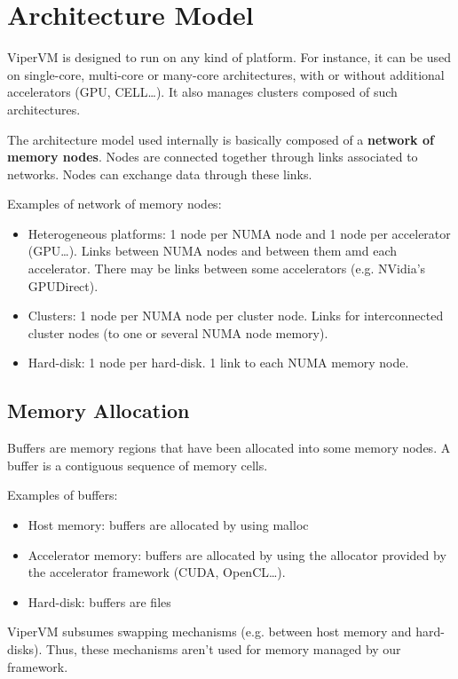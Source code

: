 \chapter{Architecture Model}

ViperVM is designed to run on any kind of platform. For instance, it can be
used on single-core, multi-core or many-core architectures, with or without
additional accelerators (GPU, CELL\ldots). It also manages clusters composed of
such architectures.

The architecture model used internally is basically composed of a \textbf{network of
memory nodes}. Nodes are connected together through links associated to
networks. Nodes can exchange data through these links.

Examples of network of memory nodes:
\begin{itemize}
  \item Heterogeneous platforms: 1 node per NUMA node and 1 node per accelerator
  (GPU\ldots). Links between NUMA nodes and between them amd each accelerator.
  There may be links between some accelerators (e.g. NVidia's GPUDirect).
  \item Clusters: 1 node per NUMA node per cluster node. Links for interconnected
  cluster nodes (to one or several NUMA node memory).
  \item Hard-disk: 1 node per hard-disk. 1 link to each NUMA memory node.
\end{itemize}

\section{Memory Allocation}
Buffers are memory regions that have been allocated into some memory nodes. A
buffer is a contiguous sequence of memory cells.

Examples of buffers:
\begin{itemize}
  \item Host memory: buffers are allocated by using malloc
  \item Accelerator memory: buffers are allocated by using the allocator
  provided by the accelerator framework (CUDA, OpenCL\ldots).
  \item Hard-disk: buffers are files
\end{itemize}

ViperVM subsumes swapping mechanisms (e.g. between host memory and  hard-disks).
Thus, these mechanisms aren't used for memory managed by our framework.

